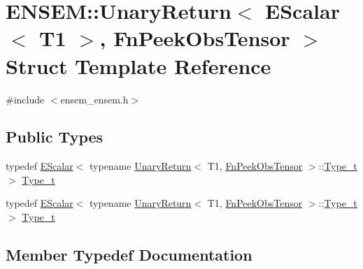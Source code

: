\hypertarget{structENSEM_1_1UnaryReturn_3_01EScalar_3_01T1_01_4_00_01FnPeekObsTensor_01_4}{}\section{E\+N\+S\+EM\+:\+:Unary\+Return$<$ E\+Scalar$<$ T1 $>$, Fn\+Peek\+Obs\+Tensor $>$ Struct Template Reference}
\label{structENSEM_1_1UnaryReturn_3_01EScalar_3_01T1_01_4_00_01FnPeekObsTensor_01_4}


{\ttfamily \#include $<$ensem\+\_\+ensem.\+h$>$}

\subsection*{Public Types}
\begin{DoxyCompactItemize}
\item 
typedef \mbox{\hyperlink{classENSEM_1_1EScalar}{E\+Scalar}}$<$ typename \mbox{\hyperlink{structENSEM_1_1UnaryReturn}{Unary\+Return}}$<$ T1, \mbox{\hyperlink{structENSEM_1_1FnPeekObsTensor}{Fn\+Peek\+Obs\+Tensor}} $>$\+::\mbox{\hyperlink{structENSEM_1_1UnaryReturn_3_01EScalar_3_01T1_01_4_00_01FnPeekObsTensor_01_4_aebe42fb1bfefa3588cabc7286faabe45}{Type\+\_\+t}} $>$ \mbox{\hyperlink{structENSEM_1_1UnaryReturn_3_01EScalar_3_01T1_01_4_00_01FnPeekObsTensor_01_4_aebe42fb1bfefa3588cabc7286faabe45}{Type\+\_\+t}}
\item 
typedef \mbox{\hyperlink{classENSEM_1_1EScalar}{E\+Scalar}}$<$ typename \mbox{\hyperlink{structENSEM_1_1UnaryReturn}{Unary\+Return}}$<$ T1, \mbox{\hyperlink{structENSEM_1_1FnPeekObsTensor}{Fn\+Peek\+Obs\+Tensor}} $>$\+::\mbox{\hyperlink{structENSEM_1_1UnaryReturn_3_01EScalar_3_01T1_01_4_00_01FnPeekObsTensor_01_4_aebe42fb1bfefa3588cabc7286faabe45}{Type\+\_\+t}} $>$ \mbox{\hyperlink{structENSEM_1_1UnaryReturn_3_01EScalar_3_01T1_01_4_00_01FnPeekObsTensor_01_4_aebe42fb1bfefa3588cabc7286faabe45}{Type\+\_\+t}}
\end{DoxyCompactItemize}


\subsection{Member Typedef Documentation}
\mbox{\label{structENSEM_1_1UnaryReturn_3_01EScalar_3_01T1_01_4_00_01FnPeekObsTensor_01_4_aebe42fb1bfefa3588cabc7286faabe45}} 
